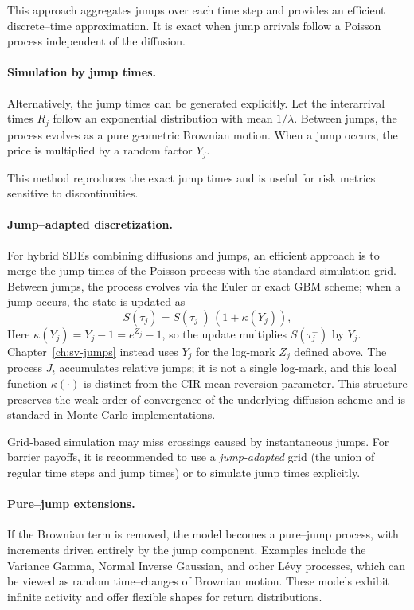 This approach aggregates jumps over each time step and provides an efficient discrete--time approximation.  
It is exact when jump arrivals follow a Poisson process independent of the diffusion.

\paragraph{Simulation by jump times.}
Alternatively, the jump times can be generated explicitly.  
Let the interarrival times \(R_j\) follow an exponential distribution with mean \(1/\lambda\).  
Between jumps, the process evolves as a pure geometric Brownian motion.  
When a jump occurs, the price is multiplied by a random factor \(Y_j\).




This method reproduces the exact jump times and is useful for risk metrics sensitive to discontinuities.

\paragraph{Jump--adapted discretization.}
For hybrid SDEs combining diffusions and jumps, an efficient approach is to merge the jump times of the Poisson process with the standard simulation grid.  
Between jumps, the process evolves via the Euler or exact GBM scheme; when a jump occurs, the state is updated as
\[
S(\tau_j) = S(\tau_j^-)\,(1 + \kappa(Y_j)),
\]
Here $\kappa(Y_j)=Y_j-1=e^{Z_j}-1$, so the update multiplies
$S(\tau_j^-)$ by $Y_j$. Chapter~\ref{ch:sv-jumps} instead uses $Y_j$ for the log-mark
$Z_j$ defined above. The process $J_t$ accumulates relative jumps;
it is not a single log-mark, and this local function $\kappa(\cdot)$
is distinct from the CIR mean-reversion parameter.
This structure preserves the weak order of convergence of the underlying diffusion scheme and is standard in Monte Carlo implementations.

\begin{remark}
Grid-based simulation may miss crossings caused by instantaneous jumps.  
For barrier payoffs, it is recommended to use a \emph{jump-adapted} grid (the union of regular time steps and jump times) or to simulate jump times explicitly.
\end{remark}


\paragraph{Pure--jump extensions.}
If the Brownian term is removed, the model becomes a pure--jump process, with increments driven entirely by the jump component.  
Examples include the Variance Gamma, Normal Inverse Gaussian, and other Lévy processes, which can be viewed as random time--changes of Brownian motion.  
These models exhibit infinite activity and offer flexible shapes for return distributions.

